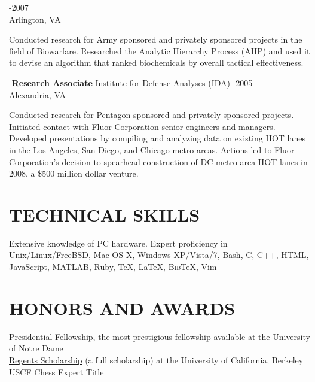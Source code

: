 \documentclass{resume}
\begin{document}
\begin{resume}
\begin{tabbing}
		-2007 \\
		\>Arlington, VA
	\end{tabbing}\vspace{-15pt}    
	Conducted research for Army sponsored and privately sponsored projects 
	in the field of Biowarfare. Researched the Analytic Hierarchy Process 
	(AHP) and used it to devise an algorithm that ranked biochemicals by 
	overall tactical effectiveness.
	\begin{tabbing}
		\hspace{2.3in}\= \hspace{2.6in}\= \kill
        {\bf Research Associate } \>\href{https://www.ida.org/}{Institute for
        Defense Analyses (IDA)} -2005\\
		\>Alexandria, VA
	\end{tabbing}\vspace{-15pt}
	Conducted research for Pentagon sponsored and privately sponsored 
	projects. Initiated contact with Fluor Corporation senior engineers and 
	managers. Developed presentations by compiling and analyzing data on 
	existing HOT lanes in the Los Angeles, San Diego, and Chicago metro 
	areas.  Actions led to Fluor Corporation's decision to spearhead 
	construction of DC metro area HOT lanes in 2008, a \$500 million dollar 
	venture.

	\section{TECHNICAL SKILLS} \vspace{0.05in}
	Extensive knowledge of PC hardware. Expert proficiency in 
Unix/Linux/FreeBSD, Mac OS X, Windows XP/Vista/7, Bash, C, C++, HTML, 
JavaScript, MATLAB, Ruby, \TeX{}, \LaTeX{}, B\textsc{ib}\TeX{}, Vim 

	\section{HONORS AND AWARDS} \vspace{0.05in}
    \href{http://graduateschool.nd.edu/admissions/financial-support/prestigious-fellowships/presidential-fellowships-arthur-j-schmitt-fellowships/}{Presidential
    Fellowship}, the most prestigious fellowship available at the 
	University of Notre Dame \\
    \href{http://students.berkeley.edu/finaid/undergraduates/types_regents.htm}{Regents
    Scholarship} (a full scholarship) at the University of California, 
	Berkeley \\
	USCF Chess Expert Title


\end{resume}
\end{document}
